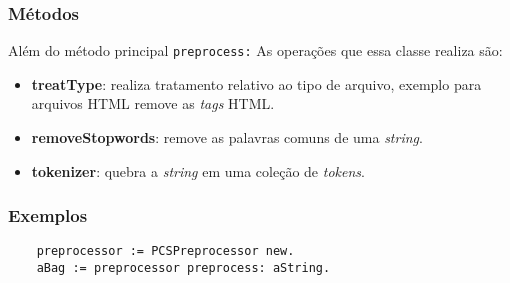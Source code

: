 \subsubsection{Métodos} 
Além do método principal \texttt{preprocess:} 
As operações que essa classe realiza são:
\begin{itemize}
    \item \textbf{treatType}: realiza tratamento relativo ao tipo de arquivo, exemplo para arquivos HTML
                     remove as \textit{tags} HTML.
    \item \textbf{removeStopwords}: remove as palavras comuns de uma \textit{string}.
    \item \textbf{tokenizer}: quebra a \textit{string} em uma coleção de \textit{tokens}.
\end{itemize}

\subsubsection{Exemplos}
    \begin{verbatim}
    preprocessor := PCSPreprocessor new.
    aBag := preprocessor preprocess: aString.
    \end{verbatim}  

